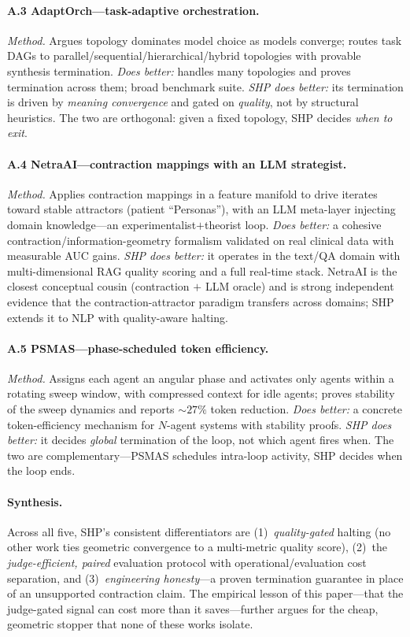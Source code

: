 \documentclass[conference]{IEEEtran}
\begin{document}
\paragraph{A.3 AdaptOrch---task-adaptive orchestration.}
\emph{Method.} Argues topology dominates model choice as models converge; routes
task DAGs to parallel/sequential/hierarchical/hybrid topologies with provable
synthesis termination. \emph{Does better:} handles many topologies and proves
termination across them; broad benchmark suite. \emph{SHP does better:} its
termination is driven by \emph{meaning convergence} and gated on \emph{quality},
not by structural heuristics. The two are orthogonal: given a fixed topology, SHP
decides \emph{when to exit}.

\paragraph{A.4 NetraAI---contraction mappings with an LLM strategist.}
\emph{Method.} Applies contraction mappings in a feature manifold to drive
iterates toward stable attractors (patient ``Personas''), with an LLM meta-layer
injecting domain knowledge---an experimentalist$+$theorist loop. \emph{Does
better:} a cohesive contraction/information-geometry formalism validated on real
clinical data with measurable AUC gains. \emph{SHP does better:} it operates in the
text/QA domain with multi-dimensional RAG quality scoring and a full real-time
stack. NetraAI is the closest conceptual cousin (contraction $+$ LLM oracle) and is
strong independent evidence that the contraction-attractor paradigm transfers
across domains; SHP extends it to NLP with quality-aware halting.

\paragraph{A.5 PSMAS---phase-scheduled token efficiency.}
\emph{Method.} Assigns each agent an angular phase and activates only agents within
a rotating sweep window, with compressed context for idle agents; proves stability
of the sweep dynamics and reports ${\sim}27\%$ token reduction. \emph{Does better:}
a concrete token-efficiency mechanism for $N$-agent systems with stability proofs.
\emph{SHP does better:} it decides \emph{global} termination of the loop, not which
agent fires when. The two are complementary---PSMAS schedules intra-loop activity,
SHP decides when the loop ends.

\paragraph{Synthesis.} Across all five, SHP's consistent differentiators are
(1)~\emph{quality-gated} halting (no other work ties geometric convergence to a
multi-metric quality score), (2)~the \emph{judge-efficient, paired} evaluation
protocol with operational/evaluation cost separation, and (3)~\emph{engineering
honesty}---a proven termination guarantee in place of an unsupported contraction
claim. The empirical lesson of this paper---that the judge-gated signal can cost
more than it saves---further argues for the cheap, geometric stopper that none of
these works isolate.
\end{document}
